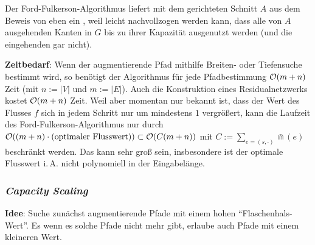 Der Ford-Fulkerson-Algorithmus liefert mit dem gerichteten Schnitt $A$ aus dem Beweis von eben
ein , weil leicht nachvollzogen werden kann, dass alle von $A$
ausgehenden Kanten in $G$ bis zu ihrer Kapazität ausgenutzt werden
(und die eingehenden gar nicht).

\linie

\textbf{Zeitbedarf}:
Wenn der augmentierende Pfad mithilfe Breiten- oder Tiefensuche bestimmt wird,
so benötigt der Algorithmus für jede Pfadbestimmung $\mathcal{O}(m + n)$ Zeit
(mit $n := |V|$ und $m := |E|$).
Auch die Konstruktion eines Residualnetzwerks kostet $\mathcal{O}(m + n)$ Zeit.
Weil aber momentan nur bekannt ist, dass der Wert des Flusses $f$ sich in jedem Schritt nur um
mindestens $1$ vergrößert, kann die Laufzeit des Ford-Fulkerson-Algorithmus nur durch\\
$\mathcal{O}((m + n) \cdot (\text{optimaler Flusswert})) \subset \mathcal{O}(C(m + n))$
mit $C := \sum_{e = (s, \cdot)} \Cap(e)$ beschränkt werden.
Das kann sehr groß sein, insbesondere ist der optimale Flusswert i.\,A. nicht polynomiell in der
Eingabelänge.

\pagebreak

\subsubsection{%
    \emph{Capacity Scaling}%
}

\textbf{Idee}:
Suche zunächst augmentierende Pfade mit einem hohen "`Flaschenhals-Wert"'.
Es wenn es solche Pfade nicht mehr gibt, erlaube auch Pfade mit einem kleineren Wert.

